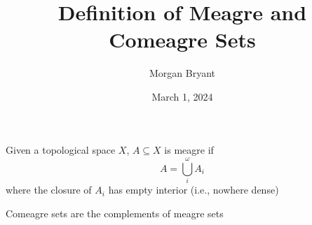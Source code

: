 \documentclass[a4paper]{article}
\title{Definition of Meagre and Comeagre Sets}
\date{March 1, 2024}
\author{Morgan Bryant}
\begin{document}
\maketitle
\par{Given a topological space \(X\), \(A \subseteq  X\) is meagre if \[A =  \bigcup _i^ \omega  A_i\] where the closure of \(A_i\) has empty interior (i.e., nowhere dense)}\par{Comeagre sets are the complements of meagre sets}
\printbibliography
\end{document}
